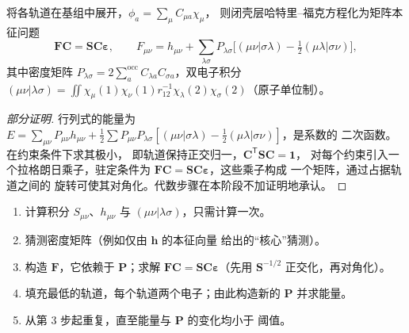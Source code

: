 \begin{theorem}\label{thm:b3:computational-chemistry:roothaan}
将各轨道在基组中展开，$\phi_a = \sum_\mu C_{\mu a}\chi_\mu$，
则闭壳层哈特里–福克方程化为矩阵本征问题
\[
\mathbf F\mathbf C = \mathbf S\mathbf C\boldsymbol\varepsilon, \qquad F_{\mu\nu} =
h_{\mu\nu} + \sum_{\lambda\sigma}P_{\lambda\sigma}\big[(\mu\nu|\sigma\lambda) -
\tfrac12(\mu\lambda|\sigma\nu)\big],
\]
其中密度矩阵 $P_{\lambda\sigma} = 2\sum_a^{\mathrm{occ}}C_{\lambda a}C_{\sigma
a}$，双电子积分 $(\mu\nu|\lambda\sigma) = \iint\chi_\mu(1)\chi_\nu(1)
r_{12}^{-1}\chi_\lambda(2)\chi_\sigma(2)$（原子单位制）。
\end{theorem}

\begin{proof}[部分证明]
行列式的能量为 $E = \sum_{\mu\nu}P_{\mu\nu}h_{\mu\nu} + \frac12
\sum P_{\mu\nu}P_{\lambda\sigma}[(\mu\nu|\sigma\lambda) - \frac12(\mu\lambda|\sigma\nu)]$，是系数的
二次函数。在约束条件下求其极小，
即轨道保持正交归一，$\mathbf C^{\mathsf T}\mathbf S\mathbf C = \mathbf 1$，
对每个约束引入一个拉格朗日乘子，驻定条件为
$\mathbf F\mathbf C = \mathbf S\mathbf C\boldsymbol\varepsilon$，这些乘子构成
一个矩阵，通过占据轨道之间的
旋转可使其对角化。代数步骤在本阶段不加证明地承认。
\end{proof}

\begin{method}[SCF 过程]\label{met:b3:computational-chemistry:scf}
\begin{enumerate}
  \item 计算积分 $S_{\mu\nu}$、$h_{\mu\nu}$ 与 $(\mu\nu|\lambda\sigma)$，只需计算一次。
  \item 猜测密度矩阵（例如仅由 $\mathbf h$ 的本征向量
        给出的“核心”猜测）。
  \item 构造 $\mathbf F$，它依赖于 $\mathbf P$；求解 $\mathbf F\mathbf C = \mathbf S\mathbf C
        \boldsymbol\varepsilon$（先用 $\mathbf S^{-1/2}$ 正交化，再对角化）。
  \item 填充最低的轨道，每个轨道两个电子；由此构造新的 $\mathbf P$
        并求能量。
  \item 从第 3 步起重复，直至能量与 $\mathbf P$ 的变化均小于
        阈值。
\end{enumerate}
\end{method}

